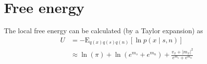 \section{Free energy}

The local free energy can be calculated (by a Taylor expansion) as 
\begin{equation}
    \begin{split}
        U
        &= -\mathrm{E}_{q(x)q(s)q(n)} \left[\ln p(x\mid s, n)\right] \\
        &\approx \ln(\pi) + \ln(e^{m_s} + e^{m_n}) +\frac{v_x + |m_x|^2}{e^{m_s} + e^{m_n}}
    \end{split}
\end{equation}